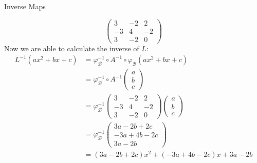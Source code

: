 \documentclass[smaller,hyperref={CJKbookmarks=true}]{beamer}
\begin{document}
\begin{frame}{Inverse Maps}
\begin{spacing}{1.1}
\[\begin{pmatrix}
           3 & -2 & 2 \\
           -3 & 4 & -2 \\
           3 & -2 & 0
         \end{pmatrix}\]
\newpage
Now we are able to calculate the inverse of $L$:
\begin{equation*}
  \begin{split}
     L^{-1}(ax^2+bx+c) &=\varphi_\mathcal{B}^{-1}\circ A^{-1}\circ\varphi_\mathcal{B}(ax^2+bx+c) \\
       &=\varphi_\mathcal{B}^{-1}\circ A^{-1}\begin{pmatrix}
               a \\
               b \\
               c
             \end{pmatrix}  \\
       &=\varphi_\mathcal{B}^{-1}\begin{pmatrix}
           3 & -2 & 2 \\
           -3 & 4 & -2 \\
           3 & -2 & 0
         \end{pmatrix}\begin{pmatrix}
                        a \\
                        b \\
                        c
                      \end{pmatrix}  \\
       &=\varphi_\mathcal{B}^{-1}\begin{pmatrix}
                                   3a-2b+2c \\
                                   -3a+4b-2c \\
                                   3a-2b
                                 \end{pmatrix}  \\
       &=(3a-2b+2c)x^2+(-3a+4b-2c)x+3a-2b
  \end{split}
\end{equation*}
\end{spacing}
\end{frame}
\end{document}

